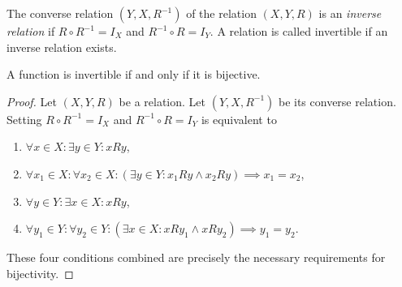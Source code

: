 \documentclass[../../main.tex]{subfiles}
\begin{document}
\begin{definition}
    The converse relation $(Y,X,R^{-1})$ of the relation $(X,Y,R)$ is an \emph{inverse relation} if $R\circ R^{-1}=I_X$ and $R^{-1}\circ R=I_Y$. A relation is called invertible if an inverse relation exists.
\end{definition}
\begin{theorem}
    A function is invertible if and only if it is bijective.
\end{theorem}
\begin{proof}
    Let $(X,Y,R)$ be a relation. Let $(Y,X,R^{-1})$ be its converse relation. Setting $R\circ R^{-1}=I_X$ and $R^{-1}\circ R=I_Y$ is equivalent to
    \begin{enumerate}
        \item
        $\forall x\in X:\exists y\in Y:xRy$,
        \item
        $\forall x_1\in X:\forall x_2\in X:(\exists y\in Y:x_1Ry\land x_2Ry)\implies x_1=x_2$,
        \item
        $\forall y\in Y:\exists x\in X:xRy$,
        \item
        $\forall y_1\in Y:\forall y_2\in Y:(\exists x\in X:xRy_1\land xRy_2)\implies y_1=y_2$.
    \end{enumerate}
    These four conditions combined are precisely the necessary requirements for bijectivity.
\end{proof}
\end{document}
